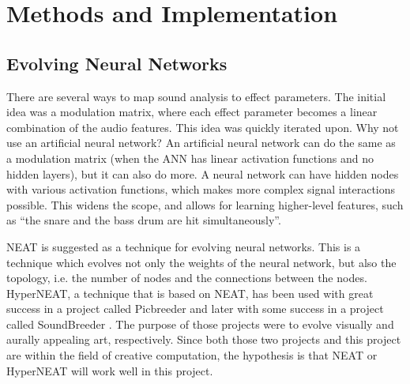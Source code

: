 \chapter{Methods and Implementation}
\label{chapter:methods_and_implementation}

\section{Evolving Neural Networks}
There are several ways to map sound analysis to effect parameters. The initial idea was a modulation matrix, where each effect parameter becomes a linear combination of the audio features. This idea was quickly iterated upon. Why not use an artificial neural network? An artificial neural network can do the same as a modulation matrix (when the ANN has linear activation functions and no hidden layers), but it can also do more. A neural network can have hidden nodes with various activation functions, which makes more complex signal interactions possible. This widens the scope, and allows for learning higher-level features, such as “the snare and the bass drum are hit simultaneously”.

NEAT \citep{stanley2002} is suggested as a technique for evolving neural networks. This is a technique which evolves not only the weights of the neural network, but also the topology, i.e. the number of nodes and the connections between the nodes. HyperNEAT, a technique that is based on NEAT, has been used with great success in a project called Picbreeder \citep{secretan2008} and later with some success in a project called SoundBreeder \citep{ye2014}. The purpose of those projects were to evolve visually and aurally appealing art, respectively. Since both those two projects and this project are within the field of creative computation, the hypothesis is that NEAT or HyperNEAT will work well in this project.

